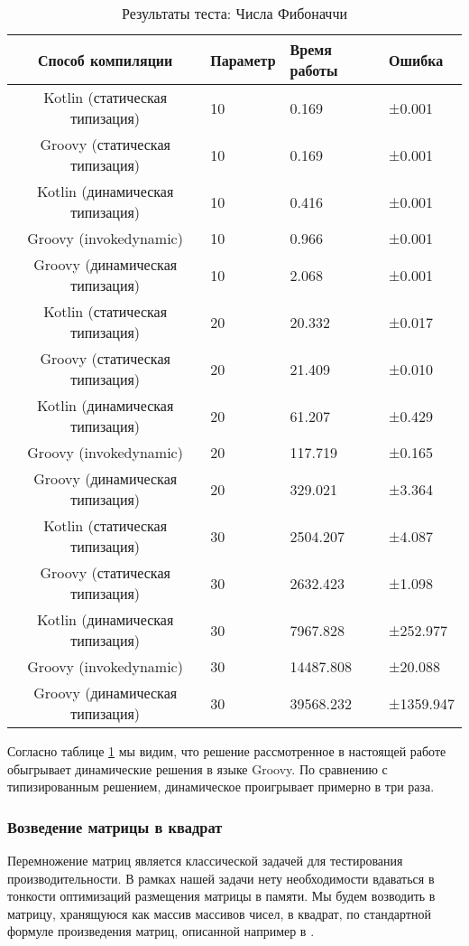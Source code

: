 \begin{table}[h]
\caption{\label{tab:fibBenchResults}Результаты теста: Числа Фибоначчи}
\begin{center}
\begin{tabular}{|c|l|l|l|}
\hline
Способ компиляции & Параметр	& Время работы & Ошибка \\
\hline
Kotlin (статическая типизация) & 10 & 0.169 & ±0.001 \\
Groovy (статическая типизация) & 10 & 0.169 & ±0.001 \\
Kotlin (динамическая типизация) & 10 & 0.416 & ±0.001 \\
Groovy (invokedynamic) & 10 & 0.966 & ±0.001 \\
Groovy (динамическая типизация) & 10 & 2.068 & ±0.001 \\
Kotlin (статическая типизация) & 20 & 20.332 & ±0.017 \\
Groovy (статическая типизация) & 20 & 21.409 & ±0.010 \\
Kotlin (динамическая типизация) & 20 & 61.207 & ±0.429 \\
Groovy (invokedynamic) & 20 & 117.719 & ±0.165 \\
Groovy (динамическая типизация) & 20 & 329.021 & ±3.364 \\
Kotlin (статическая типизация) & 30 & 2504.207 & ±4.087 \\
Groovy (статическая типизация) & 30 & 2632.423 & ±1.098 \\
Kotlin (динамическая типизация) & 30 & 7967.828 & ±252.977 \\
Groovy (invokedynamic) & 30 & 14487.808 & ±20.088 \\
Groovy (динамическая типизация) & 30 & 39568.232 & ±1359.947 \\
\hline
\end{tabular}
\end{center}
\end{table} 


Согласно таблице \ref{tab:fibBenchResults} мы видим, что решение рассмотренное в настоящей работе обыгрывает динамические решения в языке Groovy. По сравнению с типизированным решением, динамическое проигрывает примерно в три раза.


\subsubsection{Возведение матрицы в квадрат}

Перемножение матриц является классической задачей для тестирования производительности. В рамках нашей задачи нету необходимости вдаваться в тонкости оптимизаций размещения матрицы в памяти. Мы будем возводить в матрицу, хранящуюся как массив массивов чисел, в квадрат, по стандартной формуле произведения матриц, описанной например в \cite{book:KryakvinVadimDLinAlgebra}. 

